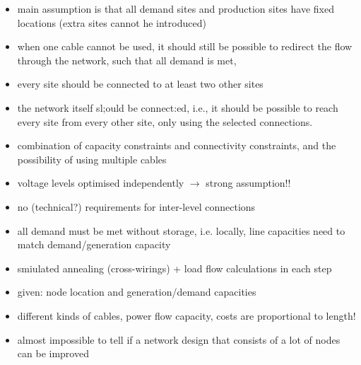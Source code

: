 \documentclass[paper=a4, fontsize=12pt]{article}
\begin{document}
\begin{itemize}
\item main assumption is that all demand sites and production sites have fixed locations (extra sites cannot he introduced)
\item when one cable cannot be used, it should still be possible to redirect the flow through the network, such that all demand is met,
\item every site should be connected to at least two other sites
\item the network itself sl;ould be connect:ed, i.e., it should be possible to reach every site from every other site, only using the selected connections.

\item combination of capacity constraints and connectivity constraints, and the possibility of using multiple cables

\item voltage levels optimised independently $\rightarrow$ strong assumption!!
\item no (technical?) requirements for inter-level connections
\item all demand must be met without storage, i.e. locally, line capacities need to match demand/generation capacity
\item smiulated annealing (cross-wirings) + load flow calculations in each step

\item given: node location and generation/demand capacities
\item different kinds of cables, power flow capacity, costs are proportional to length!

\item almost impossible to tell if a network design that consists of a lot of nodes can be improved

\end{itemize}

\subsection*{\citeauthor{Strano2012} \cite{Strano2012}}
\end{document}
